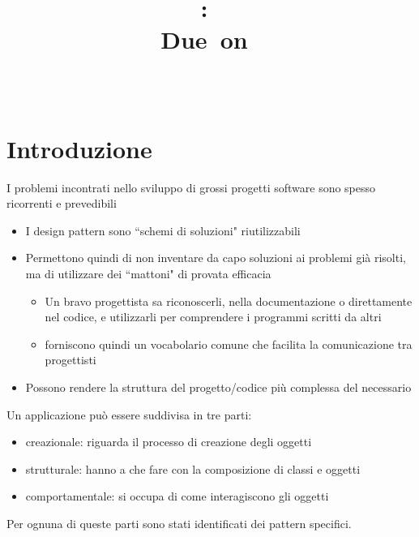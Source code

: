 \documentclass{article}
\title{
\vspace{2in}
\textmd{\textbf{\hmwkClass:\ \hmwkTitle}}\\
\normalsize\vspace{0.1in}\small{Due\ on\ \hmwkDueDate}\\
\vspace{0.1in}\large{\textit{\hmwkClassInstructor\ \hmwkClassTime}}
\vspace{3in}
}
\author{\textbf{\hmwkAuthorName}}
\date{} %
\begin{document}
\maketitle



\newpage
\tableofcontents
\newpage



\section{Introduzione}
I problemi incontrati nello sviluppo di grossi progetti software sono spesso ricorrenti e prevedibili
\begin{itemize}
\item I  design pattern sono ``schemi di soluzioni" riutilizzabili
\item  Permettono quindi di non inventare da capo soluzioni ai problemi gi\`a risolti, ma di utilizzare dei ``mattoni" di provata efficacia
\begin{itemize}
\item Un bravo progettista sa riconoscerli, nella documentazione o direttamente nel codice, e utilizzarli per comprendere i programmi scritti da altri
\item forniscono quindi un vocabolario comune che facilita la comunicazione tra progettisti
\end{itemize}
\item Possono rendere la struttura del progetto/codice pi\`u complessa del necessario
\end{itemize}

Un applicazione pu\`o essere suddivisa in tre parti:
\begin{itemize}
\item creazionale: riguarda il processo di creazione degli oggetti
\item strutturale: hanno a che fare con la composizione di classi e oggetti
\item comportamentale: si occupa di come interagiscono gli oggetti
\end{itemize}
Per ognuna di queste parti sono stati identificati dei pattern specifici.  
\end{document}
